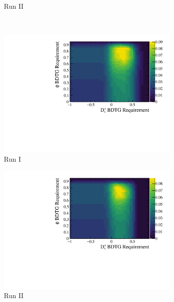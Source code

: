 \begin{figure}[!h]
\begin{subfigure}[t]{0.4\textwidth}
      \caption{Run II \decay{\Dsp}{\Kp\Km\pip}}
   \end{subfigure}\\
   \begin{subfigure}[t]{0.4\textwidth}
      \centering
      \includegraphics[width=1.0\textwidth]{figs/Selection/Ds2PiPiPi_BDTG_punzi_Run1_cont.pdf}
      \caption{Run I \decay{\Dsp}{\pip\pim\pip}}
   \end{subfigure}
   \begin{subfigure}[t]{0.4\textwidth}
      \centering
      \includegraphics[width=1.0\textwidth]{figs/Selection/Ds2PiPiPi_BDTG_punzi_Run2_cont.pdf}
      \caption{Run II \decay{\Dsp}{\pip\pim\pip}}
   \end{subfigure}\\
   \begin{subfigure}[t]{0.4\textwidth}

\end{subfigure}
\end{figure}

